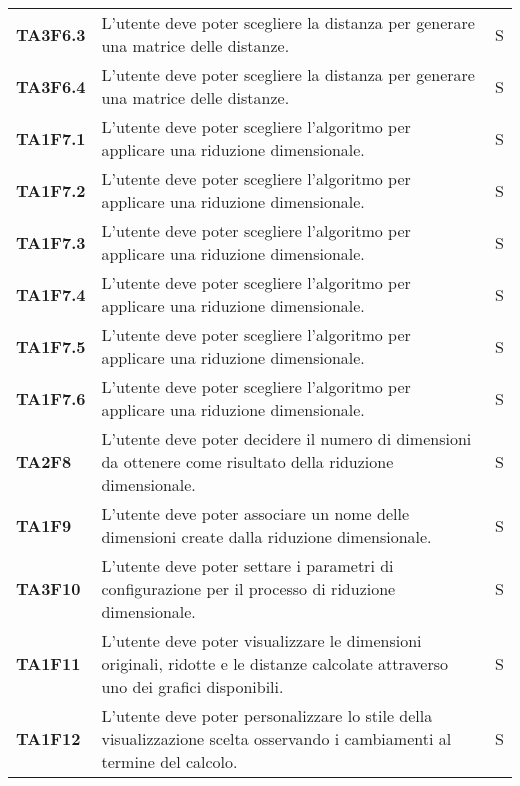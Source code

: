 {\begin{longtable}{ C{2cm} | C{12cm}| C{1.5cm} }
\textbf{TA3F6.3} & 
L'utente deve poter scegliere la distanza \textit{} per generare una matrice delle distanze. & 
S\\

\textbf{TA3F6.4} & 
L'utente deve poter scegliere la distanza \textit{} per generare una matrice delle distanze. & 
S\\

\textbf{TA1F7.1} & 
L'utente deve poter scegliere l'algoritmo  per applicare una riduzione dimensionale.  & 
S\\

\textbf{TA1F7.2} & 
L'utente deve poter scegliere l'algoritmo  per applicare una riduzione dimensionale. & 
S\\

\textbf{TA1F7.3} & 
L'utente deve poter scegliere l'algoritmo  per applicare una riduzione dimensionale. & 
S\\

\textbf{TA1F7.4} & 
L'utente deve poter scegliere l'algoritmo  per applicare una riduzione dimensionale. & 
S\\

\textbf{TA1F7.5} & 
L'utente deve poter scegliere l'algoritmo  per applicare una riduzione dimensionale. & 
S\\

\textbf{TA1F7.6} & 
L'utente deve poter scegliere l'algoritmo  per applicare una riduzione dimensionale. & 
S\\

\textbf{TA2F8} & 
L'utente deve poter decidere il numero di dimensioni da ottenere come risultato della riduzione dimensionale. & 
S\\

\textbf{TA1F9} & 
L'utente deve poter associare un nome delle dimensioni create dalla riduzione dimensionale. & 
S\\

\textbf{TA3F10} & 
L'utente deve poter settare i parametri di configurazione per il processo di riduzione dimensionale. & 
S\\

\textbf{TA1F11} & 
L'utente deve poter visualizzare le dimensioni originali, ridotte e le distanze calcolate attraverso uno dei grafici disponibili. & 
S\\

\textbf{TA1F12} & 
L'utente deve poter personalizzare lo stile della visualizzazione scelta osservando i cambiamenti al termine del calcolo. & 
S\\


\end{longtable}}

